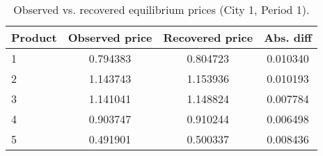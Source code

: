 \begin{table}[H]
\centering
\caption{Observed vs. recovered equilibrium prices (City 1, Period 1).}
\begin{tabular}{lccc}
\toprule
Product & Observed price & Recovered price & Abs. diff \\
\midrule
1 & 0.794383 & 0.804723 & 0.010340 \\
2 & 1.143743 & 1.153936 & 0.010193 \\
3 & 1.141041 & 1.148824 & 0.007784 \\
4 & 0.903747 & 0.910244 & 0.006498 \\
5 & 0.491901 & 0.500337 & 0.008436 \\
\bottomrule
\end{tabular}
\label{tab:q15_recover_c1t1}
\end{table}
